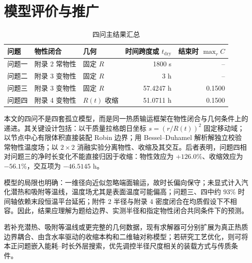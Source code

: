 \section{模型评价与推广}

\begin{table}[H]\centering\small
\caption{四问主结果汇总}\label{tab:main_results}
\setlength{\tabcolsep}{4pt}
\begin{tabular}{lllrr}\toprule
问题&物性闭合&几何&时间跨度或 $t_{\mathrm{dry}}$&结束时 $\max_rC$\\\midrule
问题一&附录 2 常物性&固定 $R$&1800 s&--\\
问题二&附录 3 变物性&固定 $R$&3 h&--\\
问题三&附录 3 变物性&固定 $R$&57.4247 h&0.1500\\
问题四&附录 4 变物性&$R(t)$ 收缩&51.0711 h&0.1500\\\bottomrule
\end{tabular}\end{table}

本文的四问不是四套孤立模型，而是同一热质输运框架在物性闭合与几何条件上的递进。其关键设计包括：以干质量拉格朗日坐标 $s=(r/R(t))^2$ 固定移动域；以节点中心有限体积直接装配 Robin 边界；用 Bessel--Duhamel 解析解独立校验常物性温度场；以 $2\times2$ 消融实验分离物性、收缩及其交互。后者表明，问题四相对问题三的净时长变化不能直接归因于收缩：物性效应为 $+126.0\%$、收缩效应为 $-56.1\%$，交互项为 $-46.5145$ h。

模型的局限也明确：一维径向近似忽略端面输运，故时长偏向保守；未显式计入汽化潜热和吸附等温线，温度场尤其是表面温度可能偏高；问题三、四中约 $93\%$ 时间轴依赖末段恒温平台延拓；附件 2 半径与附录 4 密度闭合在均质假设下不相容。因此，结果应理解为题给边界、实测半径和指定物性闭合共同条件下的预测。

若补充潜热、吸附等温线或更完整的几何数据，现有求解器可分别扩展为真正热质边界耦合、由含水率驱动的收缩本构和二维轴对称模型；若研究工艺优化，则可将本正问题嵌入能耗--时长外层搜索，优先调控半径尺度相关的装载方式与传质条件。
